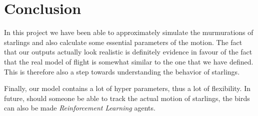 \documentclass{article}
\begin{document}
\section{Conclusion}
In this project we have been able to approximately simulate the murmurations of starlings and also calculate some essential parameters of the motion. The fact that our outputs actually look realistic is definitely evidence in favour of the fact that the real model of flight is somewhat similar to the one that we have defined. This is therefore also a step towards understanding the behavior of starlings.

Finally, our model contains a lot of hyper parameters, thus a lot of flexibility. In future, should someone be able to track the actual motion of starlings, the birds can also be made \textit{Reinforcement Learning} agents.
\end{document}
